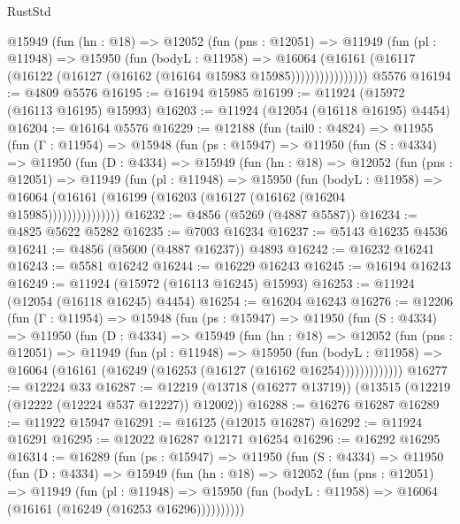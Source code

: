 \begin{lexlean}{RustStd}
\begin{coremodule}
{\begin{coremodule}
{{{{{{{{{{{{{{{{{{{{{{{{{{{{{{{{{{{{{{{{{{{{{{{{{{{{{{{{{{{{{{{{{{{{{{{{{{{{{{{{              @15949
                (fun (hn : @18) =>
                @12052
                  (fun (pns : @12051) =>
                  @11949
                    (fun (pl : @11948) =>
                    @15950
                      (fun (bodyL : @11958) =>
                      @16064
                        (@16161
                          (@16117 (@16122 (@16127 (@16162 (@16164 @15983 @15985))))))))))))))))
    @5576
@16194 := @4809 @5576
@16195 := @16194 @15985
@16199 := @11924 (@15972 (@16113 @16195) @15993)
@16203 := @11924 (@12054 (@16118 @16195) @4454)
@16204 := @16164 @5576
@16229 := @12188
    (fun (tail0 : @4824) =>
    @11955
      (fun (Γ : @11954) =>
      @15948
        (fun (ps : @15947) =>
        @11950
          (fun (S : @4334) =>
          @11950
            (fun (D : @4334) =>
            @15949
              (fun (hn : @18) =>
              @12052
                (fun (pns : @12051) =>
                @11949
                  (fun (pl : @11948) =>
                  @15950
                    (fun (bodyL : @11958) =>
                    @16064 (@16161 (@16199 (@16203 (@16127 (@16162 (@16204 @15985)))))))))))))))
@16232 := @4856 (@5269 (@4887 @5587))
@16234 := @4825 @5622 @5282
@16235 := @7003 @16234
@16237 := @5143 @16235 @4536
@16241 := @4856 (@5600 (@4887 @16237)) @4893
@16242 := @16232 @16241
@16243 := @5581 @16242
@16244 := @16229 @16243
@16245 := @16194 @16243
@16249 := @11924 (@15972 (@16113 @16245) @15993)
@16253 := @11924 (@12054 (@16118 @16245) @4454)
@16254 := @16204 @16243
@16276 := @12206
    (fun (Γ : @11954) =>
    @15948
      (fun (ps : @15947) =>
      @11950
        (fun (S : @4334) =>
        @11950
          (fun (D : @4334) =>
          @15949
            (fun (hn : @18) =>
            @12052
              (fun (pns : @12051) =>
              @11949
                (fun (pl : @11948) =>
                @15950
                  (fun (bodyL : @11958) =>
                  @16064 (@16161 (@16249 (@16253 (@16127 (@16162 @16254)))))))))))))
@16277 := @12224 @33
@16287 := @12219 (@13718 (@16277 @13719)) (@13515 (@12219 (@12222 (@12224 @537 @12227)) @12002))
@16288 := @16276 @16287
@16289 := @11922 @15947
@16291 := @16125 (@12015 @16287)
@16292 := @11924 @16291
@16295 := @12022 @16287 @12171 @16254
@16296 := @16292 @16295
@16314 := @16289
    (fun (ps : @15947) =>
    @11950
      (fun (S : @4334) =>
      @11950
        (fun (D : @4334) =>
        @15949
          (fun (hn : @18) =>
          @12052
            (fun (pns : @12051) =>
            @11949
              (fun (pl : @11948) =>
              @15950 (fun (bodyL : @11958) => @16064 (@16161 (@16249 (@16253 @16296))))))))))
}}}}}}}}}}}}}}}}}}}}}}}}}}}}}}}}}}}}}}}}}}}}}}}}}}}}}}}}}}}}}}}}}}}}}}}}}}}}}}}}
\end{coremodule}}
\end{coremodule}
\end{lexlean}
